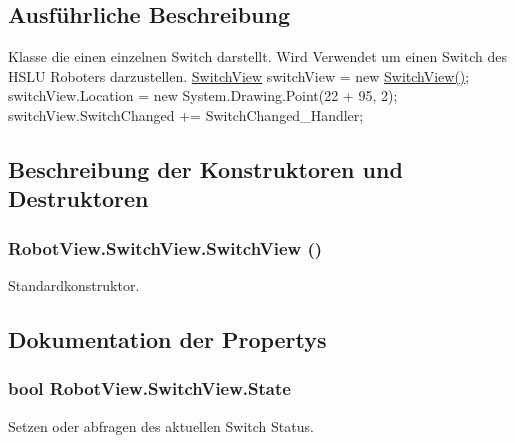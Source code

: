 \subsection{Ausführliche Beschreibung}
Klasse die einen einzelnen Switch darstellt. Wird Verwendet um einen Switch des HSLU Roboters darzustellen. {\ttfamily  \hyperlink{class_robot_view_1_1_switch_view}{SwitchView} switchView = new \hyperlink{class_robot_view_1_1_switch_view_adf984c63fc036efa55ca459e25a5cefd}{SwitchView()}; switchView.Location = new System.Drawing.Point(22 + 95, 2); switchView.SwitchChanged += SwitchChanged\_\-Handler; } 

\subsection{Beschreibung der Konstruktoren und Destruktoren}
\hypertarget{class_robot_view_1_1_switch_view_adf984c63fc036efa55ca459e25a5cefd}{
\subsubsection[{SwitchView}]{\setlength{\rightskip}{0pt plus 5cm}RobotView.SwitchView.SwitchView ()}}
\label{class_robot_view_1_1_switch_view_adf984c63fc036efa55ca459e25a5cefd}


Standardkonstruktor. 



\subsection{Dokumentation der Propertys}
\hypertarget{class_robot_view_1_1_switch_view_a78d6236230e163636d827c42cccdfbd9}{
\subsubsection[{State}]{\setlength{\rightskip}{0pt plus 5cm}bool RobotView.SwitchView.State}}
\label{class_robot_view_1_1_switch_view_a78d6236230e163636d827c42cccdfbd9}


Setzen oder abfragen des aktuellen Switch Status. 



